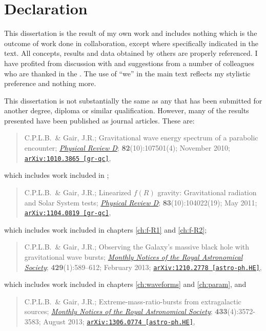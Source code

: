 \chapter*{Declaration}

This dissertation is the result of my own work and includes nothing which is the outcome of work done in collaboration, except where specifically indicated in the text. All concepts, results and data obtained by others are properly referenced. I have profited from discussion with and suggestions from a number of colleagues who are thanked in the . The use of ``we'' in the main text reflects my stylistic preference and nothing more.

This dissertation is not substantially the same as any that has been submitted for another degree, diploma or similar qualification. However, many of the results presented have been published as journal articles. These are:
\begin{quote}
C.P.L.B.\ \& Gair, J.R.; Gravitational wave energy spectrum of a parabolic encounter; \href{http://dx.doi.org/10.1103/PhysRevD.82.107501}{\it Physical Review D}; {\bf 82}(10):107501(4); November 2010; \linebreak \href{http://arxiv.org/abs/1010.3865}{\tt arXiv:1010.3865 [gr-qc]},
\end{quote}
which includes work included in ;
\begin{quote}
C.P.L.B.\ \& Gair, J.R.; Linearized $f(R)$ gravity: Gravitational radiation and Solar System tests; \href{http://dx.doi.org/10.1103/PhysRevD.83.104022}{\it Physical Review D}; {\bf 83}(10):104022(19); May 2011; \href{http://arxiv.org/abs/1104.0819}{\tt arXiv:1104.0819 [gr-qc]},
\end{quote}
which includes work included in chapters \ref{ch:f-R1} and \ref{ch:f-R2};
\begin{quote}
C.P.L.B.\ \& Gair, J.R.; Observing the Galaxy's massive black hole with gravitational wave bursts; \href{http://dx.doi.org/10.1093/mnras/sts360}{\it Monthly Notices of the Royal Astronomical Society}; {\bf 429}(1):589--612; February 2013; \href{http://arxiv.org/abs/1210.2778}{\tt arXiv:1210.2778 [astro-ph.HE]},
\end{quote}
which includes work included in chapters \ref{ch:waveforms} and \ref{ch:param}, and
\begin{quote}
C.P.L.B.\ \& Gair, J.R.; Extreme-mass-ratio-bursts from extragalactic sources; \href{http://dx.doi.org/10.1093/mnras/stt990}{\it Monthly Notices of the Royal Astronomical Society}; {\bf 433}(4):3572-3583; August 2013; \href{http://arxiv.org/abs/1306.0774}{\tt arXiv:1306.0774 [astro-ph.HE]},
\end{quote}
